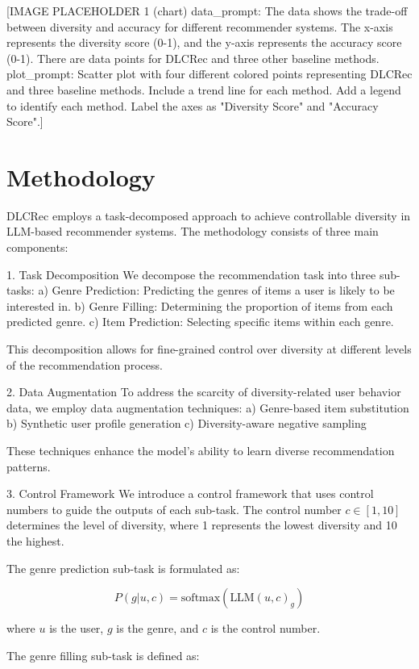 \documentclass[12pt,letterpaper]{article}
\begin{document}
[IMAGE PLACEHOLDER 1 (chart)
data_prompt: The data shows the trade-off between diversity and accuracy for different recommender systems. The x-axis represents the diversity score (0-1), and the y-axis represents the accuracy score (0-1). There are data points for DLCRec and three other baseline methods.
plot_prompt: Scatter plot with four different colored points representing DLCRec and three baseline methods. Include a trend line for each method. Add a legend to identify each method. Label the axes as "Diversity Score" and "Accuracy Score".]

\section{Methodology}

DLCRec employs a task-decomposed approach to achieve controllable diversity in LLM-based recommender systems. The methodology consists of three main components:

1. Task Decomposition
We decompose the recommendation task into three sub-tasks:
a) Genre Prediction: Predicting the genres of items a user is likely to be interested in.
b) Genre Filling: Determining the proportion of items from each predicted genre.
c) Item Prediction: Selecting specific items within each genre.

This decomposition allows for fine-grained control over diversity at different levels of the recommendation process.

2. Data Augmentation
To address the scarcity of diversity-related user behavior data, we employ data augmentation techniques:
a) Genre-based item substitution
b) Synthetic user profile generation
c) Diversity-aware negative sampling

These techniques enhance the model's ability to learn diverse recommendation patterns.

3. Control Framework
We introduce a control framework that uses control numbers to guide the outputs of each sub-task. The control number \(c \in [1, 10]\) determines the level of diversity, where 1 represents the lowest diversity and 10 the highest.

The genre prediction sub-task is formulated as:

\[P(g|u, c) = \text{softmax}(\text{LLM}(u, c)_g)\]

where \(u\) is the user, \(g\) is the genre, and \(c\) is the control number.

The genre filling sub-task is defined as:
\end{document}
